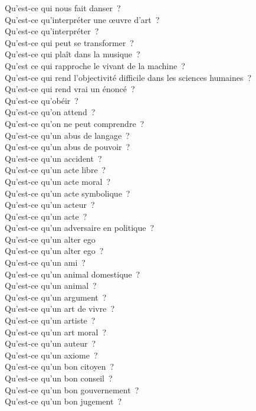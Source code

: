 \documentclass[a4paper,12pt]{article}
\begin{document}
Qu'est-ce qui nous fait danser ? \\
Qu'est-ce qu'interpréter une œuvre d'art ? \\
Qu'est-ce qu'interpréter ? \\
Qu'est-ce qui peut se transformer ? \\
Qu'est-ce qui plaît dans la musique ? \\
Qu'est ce qui rapproche le vivant de la machine ? \\
Qu'est-ce qui rend l'objectivité difficile dans les sciences humaines ? \\
Qu'est-ce qui rend vrai un énoncé ? \\
Qu'est-ce qu'obéir ? \\
Qu'est-ce qu'on attend ? \\
Qu'est-ce qu'on ne peut comprendre ? \\
Qu'est-ce qu'un abus de langage ? \\
Qu'est-ce qu'un abus de pouvoir ? \\
Qu'est-ce qu'un accident ? \\
Qu'est-ce qu'un acte libre ? \\
Qu'est-ce qu'un acte moral ? \\
Qu'est-ce qu'un acte symbolique ? \\
Qu'est-ce qu'un acteur ? \\
Qu'est-ce qu'un acte ? \\
Qu'est-ce qu'un adversaire en politique ? \\
Qu'est-ce qu'un alter ego \\
Qu'est-ce qu'un alter ego ? \\
Qu'est-ce qu'un ami ? \\
Qu'est-ce qu'un animal domestique ? \\
Qu'est-ce qu'un animal ? \\
Qu'est-ce qu'un argument ? \\
Qu'est-ce qu'un art de vivre ? \\
Qu'est-ce qu'un artiste ? \\
Qu'est-ce qu'un art moral ? \\
Qu'est-ce qu'un auteur ? \\
Qu'est-ce qu'un axiome ? \\
Qu'est-ce qu'un bon citoyen ? \\
Qu'est-ce qu'un bon conseil ? \\
Qu'est-ce qu'un bon gouvernement ? \\
Qu'est-ce qu'un bon jugement ? \\
\end{document}
